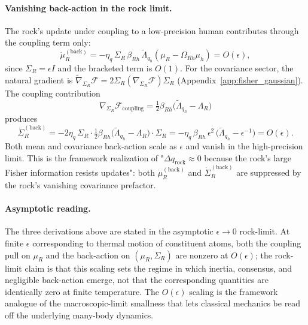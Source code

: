 \documentclass[11pt]{article}
\begin{document}
\paragraph{Vanishing back-action in the rock limit.} The rock's update under coupling to a low-precision human contributes through the coupling term only:
\begin{equation}
\dot{\mu}_R^{(\mathrm{back})} = -\eta_q\,\Sigma_R\,\beta_{Rh}\,\tilde{\Lambda}_{q_h}(\mu_R - \Omega_{Rh}\mu_h) = O(\epsilon),
\label{eq:rock_back_mu}
\end{equation}
since $\Sigma_R = \epsilon I$ and the bracketed term is $O(1)$. For the covariance sector, the natural gradient is $\tilde{\nabla}_{\Sigma_R}\mathcal{F} = 2\Sigma_R(\nabla_{\Sigma_R}\mathcal{F})\Sigma_R$ (Appendix~\ref{app:fisher_gaussian}). The coupling contribution
\begin{equation}
\nabla_{\Sigma_R}\mathcal{F}_{\mathrm{coupling}} = \tfrac{1}{2}\beta_{Rh}\big(\tilde{\Lambda}_{q_h} - \Lambda_R\big)
\end{equation}
produces
\begin{equation}
\dot{\Sigma}_R^{(\mathrm{back})} = -2\eta_q\,\Sigma_R \cdot \tfrac{1}{2}\beta_{Rh}\big(\tilde{\Lambda}_{q_h} - \Lambda_R\big)\cdot \Sigma_R = -\eta_q\,\beta_{Rh}\,\epsilon^2\,\big(\tilde{\Lambda}_{q_h} - \epsilon^{-1}\big) = O(\epsilon).
\label{eq:rock_back_sigma}
\end{equation}
Both mean and covariance back-action scale as $\epsilon$ and vanish in the high-precision limit. This is the framework realization of "$\Delta q_{\mathrm{rock}} \approx 0$ because the rock's large Fisher information resists updates": both $\dot{\mu}_R^{(\mathrm{back})}$ and $\dot{\Sigma}_R^{(\mathrm{back})}$ are suppressed by the rock's vanishing covariance prefactor.

\paragraph{Asymptotic reading.} The three derivations above are stated in the asymptotic $\epsilon \to 0$ rock-limit. At finite $\epsilon$ corresponding to thermal motion of constituent atoms, both the coupling pull on $\mu_R$ and the back-action on $(\mu_R, \Sigma_R)$ are nonzero at $O(\epsilon)$; the rock-limit claim is that this scaling sets the regime in which inertia, consensus, and negligible back-action emerge, not that the corresponding quantities are identically zero at finite temperature. The $O(\epsilon)$ scaling is the framework analogue of the macroscopic-limit smallness that lets classical mechanics be read off the underlying many-body dynamics.
\end{document}
